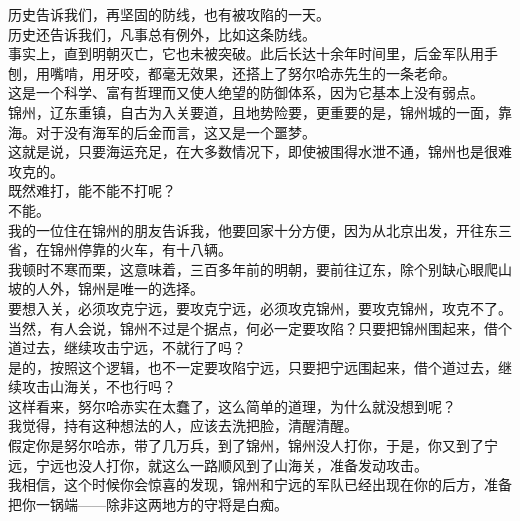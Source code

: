 \begin{multicols}{\theparacolNo}
历史告诉我们，再坚固的防线，也有被攻陷的一天。\\

历史还告诉我们，凡事总有例外，比如这条防线。\\

事实上，直到明朝灭亡，它也未被突破。此后长达十余年时间里，后金军队用手刨，用嘴啃，用牙咬，都毫无效果，还搭上了努尔哈赤先生的一条老命。\\

这是一个科学、富有哲理而又使人绝望的防御体系，因为它基本上没有弱点。\\

锦州，辽东重镇，自古为入关要道，且地势险要，更重要的是，锦州城的一面，靠海。对于没有海军的后金而言，这又是一个噩梦。\\

这就是说，只要海运充足，在大多数情况下，即使被围得水泄不通，锦州也是很难攻克的。\\

既然难打，能不能不打呢？\\

不能。\\

我的一位住在锦州的朋友告诉我，他要回家十分方便，因为从北京出发，开往东三省，在锦州停靠的火车，有十八辆。\\

我顿时不寒而栗，这意味着，三百多年前的明朝，要前往辽东，除个别缺心眼爬山坡的人外，锦州是唯一的选择。\\

要想入关，必须攻克宁远，要攻克宁远，必须攻克锦州，要攻克锦州，攻克不了。\\

当然，有人会说，锦州不过是个据点，何必一定要攻陷？只要把锦州围起来，借个道过去，继续攻击宁远，不就行了吗？\\

是的，按照这个逻辑，也不一定要攻陷宁远，只要把宁远围起来，借个道过去，继续攻击山海关，不也行吗？\\

这样看来，努尔哈赤实在太蠢了，这么简单的道理，为什么就没想到呢？\\

我觉得，持有这种想法的人，应该去洗把脸，清醒清醒。\\

假定你是努尔哈赤，带了几万兵，到了锦州，锦州没人打你，于是，你又到了宁远，宁远也没人打你，就这么一路顺风到了山海关，准备发动攻击。\\

我相信，这个时候你会惊喜的发现，锦州和宁远的军队已经出现在你的后方，准备把你一锅端——除非这两地方的守将是白痴。\\


\end{multicols}
